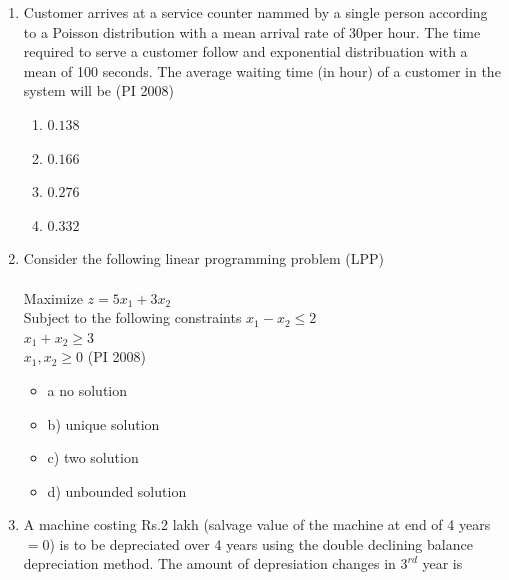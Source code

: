 \documentclass[journal,12pt,onecolumn]{IEEEtran}
\theoremstyle{remark}
\begin{document}
\begin{enumerate}
    \hfill{(PI 2008)}
    \begin{multicols}{4}
    \begin{enumerate}
        \item $Rs.10,00,000$
        \item $Rs.15,00,000$
        \item $Rs.20,00,000$
        \item $Rs.25,00,000$
    \end{enumerate}
\end{multicols}
\item %
Customer arrives at a service counter nammed by a single person according to a Poisson distribution with a mean arrival rate of 30per hour. The time required to serve a customer follow and exponential distribuation with a mean of 100 seconds. The average waiting time (in hour) of a customer in the system will be
    \hfill{(PI 2008)}
    \begin{multicols}{4}
    \begin{enumerate}
        \item $0.138$
        \item $0.166$
        \item $0.276$
        \item $0.332$
    \end{enumerate}
\end{multicols}
\item %
Consider the following linear programming problem (LPP)  \\ \\
Maximize $z=5x_1+3x_2$\\
Subject to the following constraints
$x_1-x_2\leq2$\\
$x_1+x_2\geq 3$\\
$x_1,x_2\geq 0$
    \hfill{(PI 2008)}
    \begin{itemize}[label={}]
        \item a no solution
        \item b) unique solution
        \item c) two solution
        \item d) unbounded solution
    \end{itemize}
\vspace{1cm}
 \item %
 A machine costing Rs.2 lakh (salvage value of the machine at end of 4 years $= 0$) is to be depreciated over 4 years using the double declining balance depreciation method. The amount of depresiation changes in $3^{rd}$ year is 

\end{enumerate}
\end{document}
